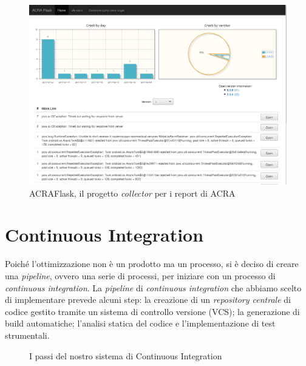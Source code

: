 \documentclass[a4paper,10pt]{memoir}
\begin{document}
\begin{figure}[ht]
\centering
\caption{ACRAFlask, il progetto \textit{collector} per i report di ACRA}
\label{fig:acraflask}
\includegraphics[width=\textwidth]{dev/acraflask}
\end{figure}

\clearpage

\section{Continuous Integration}
\label{section:ci}

Poiché l'ottimizzazione non è un prodotto ma un processo, si è deciso di creare una \textit{pipeline}, ovvero una serie di processi, per iniziare con un processo di \textit{continuous integration}. La \textit{pipeline} di \textit{continuous integration} che abbiamo scelto di implementare prevede alcuni step: la creazione di un \textit{repository centrale} di codice gestito tramite un sistema di controllo versione (VCS); la generazione di build automatiche; l'analisi statica del codice e l'implementazione di test strumentali.

\begin{figure}[ht]
\centering
\caption{I passi del nostro sistema di Continuous Integration}
\end{figure}
\end{document}
